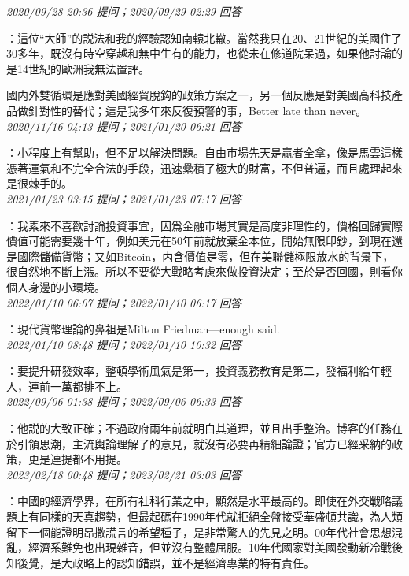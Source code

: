 \documentclass[twocolumn]{ctexart}
\begin{document}
\textit{\hfill\noindent\small 2020/09/28 20:36 提问；2020/09/29 02:29 回答}

：這位“大師”的説法和我的經驗認知南轅北轍。當然我只在20、21世紀的美國住了30多年，既沒有時空穿越和無中生有的能力，也從未在修道院呆過，如果他討論的是14世紀的歐洲我無法置評。

國内外雙循環是應對美國經貿脫鈎的政策方案之一，另一個反應是對美國高科技產品做針對性的替代；這是我多年來反復預警的事，Better late than never。
\\

\textit{\hfill\noindent\small 2020/11/16 04:13 提问；2021/01/20 06:21 回答}

：小程度上有幫助，但不足以解決問題。自由市場先天是贏者全拿，像是馬雲這樣憑著運氣和不完全合法的手段，迅速纍積了極大的財富，不但普遍，而且處理起來是很棘手的。
\\

\textit{\hfill\noindent\small 2021/01/23 03:15 提问；2021/01/23 07:17 回答}

：我素來不喜歡討論投資事宜，因爲金融市場其實是高度非理性的，價格回歸實際價值可能需要幾十年，例如美元在50年前就放棄金本位，開始無限印鈔，到現在還是國際儲備貨幣；又如Bitcoin，内含價值是零，但在美聯儲極限放水的背景下，很自然地不斷上漲。所以不要從大戰略考慮來做投資決定；至於是否回國，則看你個人身邊的小環境。
\\

\textit{\hfill\noindent\small 2022/01/10 06:07 提问；2022/01/10 06:17 回答}

：現代貨幣理論的鼻祖是Milton Friedman---enough said.
\\

\textit{\hfill\noindent\small 2022/01/10 08:48 提问；2022/01/10 10:32 回答}

：要提升研發效率，整頓學術風氣是第一，投資義務教育是第二，發福利給年輕人，連前一萬都排不上。
\\

\textit{\hfill\noindent\small 2022/09/06 01:38 提问；2022/09/06 06:33 回答}

：他説的大致正確；不過政府兩年前就明白其道理，並且出手整治。博客的任務在於引領思潮，主流輿論理解了的意見，就沒有必要再精細論證；官方已經采納的政策，更是連提都不用提。
\\

\textit{\hfill\noindent\small 2023/02/18 00:48 提问；2023/02/21 03:03 回答}

：中國的經濟學界，在所有社科行業之中，顯然是水平最高的。即使在外交戰略議題上有同樣的天真趨勢，但最起碼在1990年代就拒絕全盤接受華盛頓共識，為人類留下一個能證明昂撒謊言的希望種子，是非常驚人的先見之明。00年代社會思想混亂，經濟系難免也出現雜音，但並沒有整體屈服。10年代國家對美國發動新冷戰後知後覺，是大政略上的認知錯誤，並不是經濟專業的特有責任。
\end{document}

